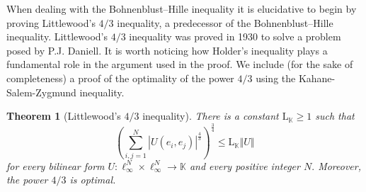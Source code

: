 \documentclass[10pt]{amsart}
\newtheorem{theorem}{Theorem}[section]
\numberwithin{equation}{section}
\begin{document}
When dealing with the Bohnenblust--Hille inequality it is elucidative to
begin by proving Littlewood's $4/3$ inequality, a predecessor of the
Bohnenblust--Hille inequality. Littlewood's $4/3$ inequality was proved in
1930 to solve a problem posed by P.J. Daniell. It is worth noticing how
Holder's inequality plays a fundamental role in the argument used in the
proof. We include (for the sake of completeness) a proof of the optimality
of the power $4/3$ using the Kahane-Salem-Zygmund inequality.

\begin{theorem}[Littlewood's $4/3$ inequality]
\label{Littlewood43} There is a constant $\mathrm{L}_{\mathbb{K}}\geq1$ such
that
\begin{equation*}
\left( \sum\limits_{i,j=1}^{N}\left\vert U(e_{i},e_{j})\right\vert ^{\frac {4}{3}}\right) ^{\frac{3}{4}}\leq \mathrm{L}_{\mathbb{K}}\left\Vert
U\right\Vert
\end{equation*}
for every bilinear form $U:\ell_{\infty}^{N}\times\ell_{\infty}^{N}\rightarrow\mathbb{K}$ and every positive integer $N.$ Moreover, the power $4/3$ is optimal.
\end{theorem}
\end{document}
